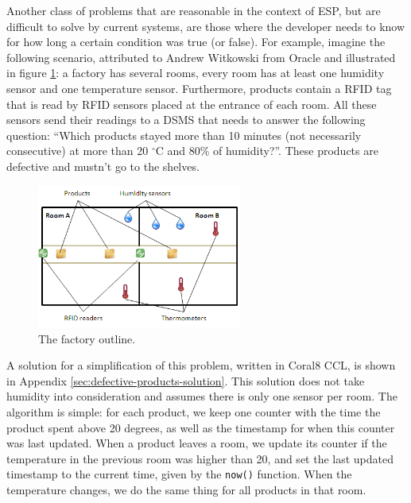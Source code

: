 Another class of problems that are reasonable in the context of ESP,
but are difficult to solve by current systems, are those where the
developer needs to know for how long a certain condition was true (or
false). For example, imagine the following scenario, attributed to
Andrew Witkowski from Oracle and illustrated in figure
\ref{fig:factory}: a factory has several rooms, every room has at
least one humidity sensor and one temperature sensor. Furthermore,
products contain a RFID tag that is read by RFID sensors placed at the
entrance of each room. All these sensors send their readings to a DSMS
that needs to answer the following question: ``Which products stayed
more than 10 minutes (not necessarily consecutive) at more than 20
$^{\circ}$C and 80\% of humidity?''. These products are defective and
mustn't go to the shelves.

\begin{figure}[htbp]
  \center
  \includegraphics[width=0.6\textwidth]{factory.png}
  \caption{The factory outline.}
  \label{fig:factory}
\end{figure}


A solution for a simplification of this problem, written in Coral8
CCL, is shown in Appendix \ref{sec:defective-products-solution}. This
solution does not take humidity into consideration and assumes there
is only one sensor per room. The algorithm is simple: for each
product, we keep one counter with the time the product spent above 20
degrees, as well as the timestamp for when this counter was last
updated. When a product leaves a room, we update its counter if the
temperature in the previous room was higher than 20, and set the last
updated timestamp to the current time, given by the \verb=now()=
function. When the temperature changes, we do the same thing for all
products in that room.

